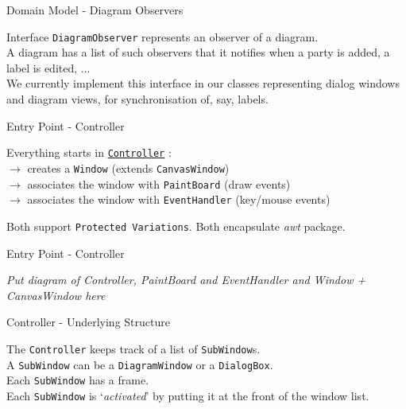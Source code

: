 \documentclass[10pt]{beamer}
\begin{document}
\begin{frame}[fragile]{Domain Model - Diagram Observers}
	\begin{center}
	Interface \texttt{DiagramObserver} represents an observer of a diagram. \\
	\vspace{0.5cm}
	A diagram has a list of such observers that it notifies when a party is added, a label is edited, ...\\
	\vspace{0.5cm}
	\footnotesize We currently implement this interface in our classes representing dialog windows and diagram views, for synchronisation of, say, labels.
	\end{center}
\end{frame}

\begin{frame}[fragile]{Entry Point - Controller}
	\begin{center}
	Everything starts in \underline{\texttt{Controller}} :
	\vspace{0.5cm}
	\\$\rightarrow$ creates a \texttt{Window} (extends \texttt{CanvasWindow})
	\\$\rightarrow$ associates the window with \texttt{PaintBoard} (draw events)
	\\$\rightarrow$ associates the window with \texttt{EventHandler} (key/mouse events)
	
	\vspace{0.5cm} Both support \texttt{Protected Variations}. Both encapsulate \textit{awt} package.
	\end{center}
\end{frame}

\begin{frame}[fragile]{Entry Point - Controller}
	\begin{center}
	\textit{Put diagram of Controller, PaintBoard and EventHandler and Window + CanvasWindow here}
	\end{center}
\end{frame}

\begin{frame}[fragile]{Controller - Underlying Structure}
	\begin{center}
	The \texttt{Controller} keeps track of a list of \texttt{SubWindow}s.
	\\\vspace{0.5cm} A \texttt{SubWindow} can be a \texttt{DiagramWindow} or a \texttt{DialogBox}.
	\\\vspace{0.5cm} Each \texttt{SubWindow} has a frame.
	\\\vspace{0.5cm} \footnotesize Each \texttt{SubWindow} is `\textit{activated}' by putting it at the front of the window list.
	\end{center}
\end{frame}
\end{document}
